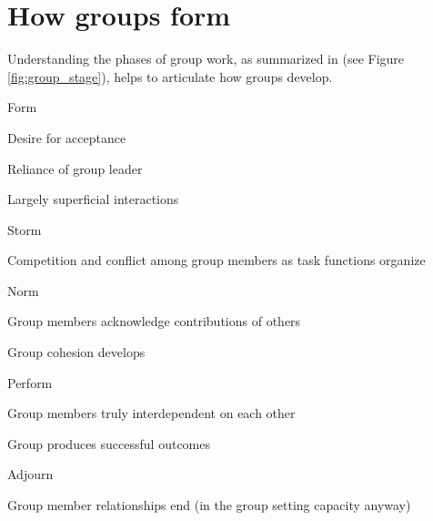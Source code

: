 \documentclass[12pt]{notes}
\begin{document}

\section{How groups form}
Understanding the \cite{tuckman1965} phases of group work, as summarized in \cite{cullen2015} (see Figure \ref{fig:group_stage}), helps to articulate how groups develop. 

\bi
\item Form
\bi
\item Desire for acceptance
\item Reliance of group leader
\item Largely superficial interactions
\ei
\item Storm
\bi
\item Competition and conflict among group members as task functions organize
\ei
\item Norm
\bi
\item Group members acknowledge contributions of others
\item Group cohesion develops
\ei
\item Perform
\bi
\item Group members truly interdependent on each other 
\item Group produces successful outcomes
\ei
\item Adjourn
\bi
\item Group member relationships end (in the group setting capacity anyway)
\ei
\ei


\begin{minipage}[l][3cm][c]{\textwidth}

\end{minipage}


\begin{minipage}[l][3cm][c]{\textwidth}

\end{minipage}
\end{document}
